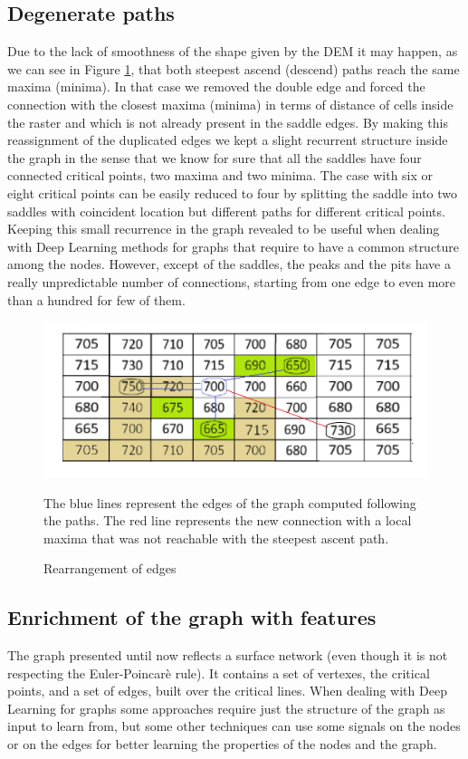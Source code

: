 \subsection{Degenerate paths}
Due to the lack of smoothness of the shape given by the DEM it may happen, as we can see in Figure \ref{fig:edge_rearrangement}, that both steepest ascend (descend) paths reach the same maxima (minima). In that case we removed the double edge and forced the connection with the closest maxima (minima) in terms of distance of cells inside the raster and which is not already present in the saddle edges. By making this reassignment of the duplicated edges we kept a slight recurrent structure inside the graph in the sense that we know for sure that all the saddles have four connected critical points, two maxima and two minima. The case with six or eight critical points can be easily reduced to four by splitting the saddle into two saddles with coincident location but different paths for different critical points. Keeping this small recurrence in the graph revealed to be useful when dealing with Deep Learning methods for graphs that require to have a common structure among the nodes. However, except of the saddles, the peaks and the pits have a really unpredictable number of connections, starting from one edge to even more than a hundred for few of them.

\begin{figure} 
\centering
\includegraphics[width=13cm]{pictures/sequences_with_paths_degenerate.png}
\caption{Rearrangement of edges}
The blue lines represent the edges of the graph computed following the paths. The red line represents the new connection with a local maxima that was not reachable with the steepest ascent path. 
\label{fig:edge_rearrangement}
\end{figure}

\subsection{Enrichment of the graph with features}
The graph presented until now reflects a surface network (even though it is not respecting the Euler-Poincarè rule). It contains a set of vertexes, the critical points, and a set of edges, built over the critical lines. When dealing with Deep Learning for graphs some approaches require just the structure of the graph as input to learn from, but some other techniques can use some signals on the nodes or on the edges for better learning the properties of the nodes and the graph.

